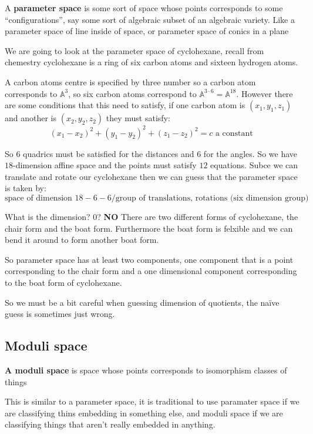 \begin{definition}
    A\textbf{ parameter space} is some sort of space whose points corresponds to some ``configurations'', say some sort of algebraic subset of an algebraic variety. Like a parameter space of line inside of space, or parameter space of conics in a plane 
\end{definition}

We are going to look at the parameter space of cyclohexane, recall from chemestry cyclohexane is a ring of six carbon atoms and sixteen hydrogen atoms. 

A carbon atoms centre is specified by three number so a carbon atom corresponds to $\mathbb{A}^3$, so six carbon atoms correspond to $\mathbb{A}^{3\cdot 6} = \mathbb{A}^{18}$. However there are some conditions that this need to satisfy, if one carbon atom is $(x_1,y_1,z_1)$ and another is $(x_2,y_2,z_2)$ they must satisfy:\begin{equation}
    (x_1-x_2)^2+(y_1-y_2)^2+(z_1-z_2)^2 = c \text{ a constant }
\end{equation}

So $6$ quadrics must be satisfied for the distances and $6$ for the angles. So we have $18$-dimension affine space and the points must satisfy $12$ equations. Subce we can translate and rotate our cyclohexane then we can guess that the parameter space is taken by:\begin{equation}
    \text{space of dimension }18-6-6 / \text{group of translations, rotations (six dimension group)}
\end{equation}

What is the dimension? $0$? \textbf{NO} There are two different forms of cyclohexane, the chair form and the boat form. Furthermore the boat form is felxible and we can bend it around to form another boat form.

So parameter space has at least two components, one component that is a point corresponding to the chair form and a one dimensional component corresponding to the boat form of cyclohexane.

So we must be a bit careful when guessing dimension of quotients, the naïve guess is sometimes just wrong.

\subsection{Moduli space}

\begin{definition}
    \textbf{A moduli space} is space whose points corresponds to isomorphism classes of things
\end{definition}
This is similar to a parameter space, it is traditional to use paramater space if we are classifying thins embedding in something else, and moduli space if we are classifying things that aren't really embedded in anything.

